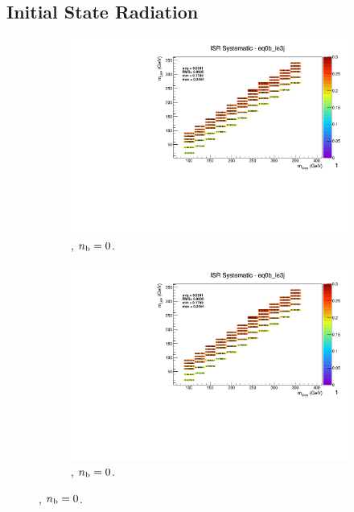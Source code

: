 \newpage
\subsection*{Initial State Radiation}
\label{sec:t2cc_isr_plots}

\begin{figure}[ht!]
  \centering
  \begin{subfigure}[b]{0.32\textwidth}
    \includegraphics[width=\textwidth, page=12]{Figs/sms/t2cc/v37/systs/T2cc_ISR_eq0b_le3j.pdf}
    \caption{\njlow, $n_{\text{b}} = 0$.}
  \end{subfigure}
  \begin{subfigure}[b]{0.32\textwidth}
    \includegraphics[width=\textwidth, page=8]{Figs/sms/t2cc/v37/systs/T2cc_ISR_eq0b_le3j.pdf}
    \caption{\njlow, $n_{\text{b}} = 0$.}
  \end{subfigure}

\end{figure}
